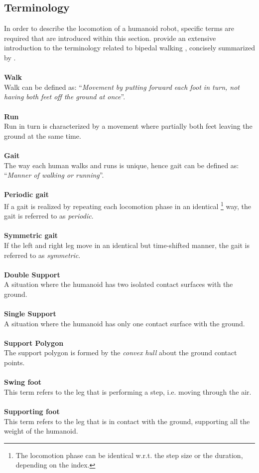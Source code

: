 \subsection{Terminology}
In order to describe the locomotion of a humanoid robot, specific terms are required that are introduced within this section. \citeauthor{vukobratovic2007towards} provide an extensive introduction to the terminology related to bipedal walking \cite{vukobratovic2007towards}, concisely summarized by \citeauthor{dekker2009zero} \cite{dekker2009zero}.\\\\
\textbf{Walk}\\
Walk can be defined as: ``\textit{Movement by putting forward each foot in turn, not having both feet off the ground at once}''.\\\\
\textbf{Run}\\
Run in turn is characterized by  a movement where partially both feet leaving the ground at the same time.\\\\
\textbf{Gait}\\
The way each human walks and runs is unique, hence gait can be defined as: ``\textit{Manner of walking or running}''.\\\\
\textbf{Periodic gait}\\
If a gait is realized by repeating each locomotion phase in an identical 
\footnote{The locomotion phase can be identical w.r.t. the step size or the duration, depending on the index.} way, the gait is referred to as \textit{periodic}.\\\\
\textbf{Symmetric gait}\\
If the left and right leg move in an identical but time-shifted manner, the gait is referred to as \textit{symmetric}.\\\\
\textbf{Double Support}\\
A situation where the humanoid has two isolated contact surfaces with the ground.\\\\
\textbf{Single Support}\\
A situation where  the humanoid has only one contact surface with the ground.\\\\
\textbf{Support Polygon}\\%
The support polygon is formed by the \textit{convex hull} about the ground contact points.    \\\\
\textbf{Swing foot}\\
This term refers to the leg that is performing a step, i.e. moving through the air.\\\\
\textbf{Supporting foot}\\
This term refers to the leg that is in contact with the ground, supporting all the weight of the humanoid. 

